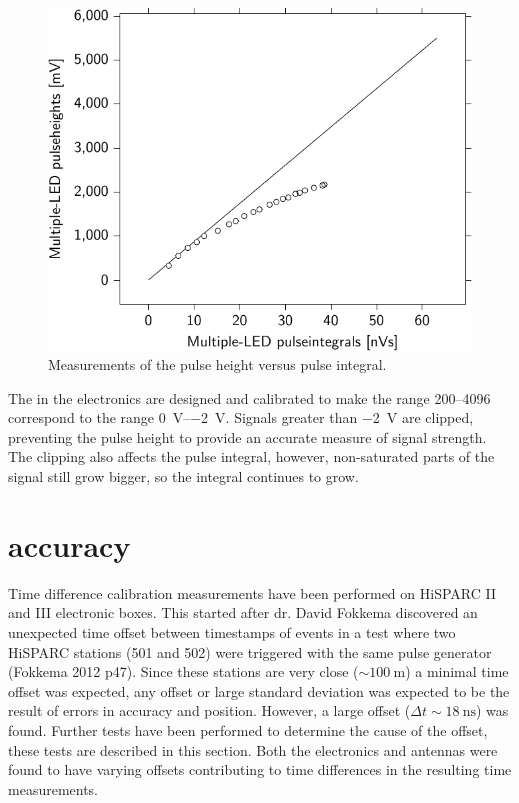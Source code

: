 \begin{figure}
    \centering
    \includegraphics{plots/calibration/linearity_senstech_ph_pi}
    \caption{Measurements of the pulse height versus pulse integral.}
    \label{fig:linearity_senstech_ph_pi}
\end{figure}

The \adcs in the \hisparc electronics are designed and calibrated to
make the range \SIrange{200}{4096}{\adc} correspond to the range
\SIrange{0}{-2}{\volt}. Signals greater than \SI{-2}{\volt} are clipped,
preventing the pulse height to provide an accurate measure of signal
strength. The clipping also affects the pulse integral, however,
non-saturated parts of the signal still grow bigger, so the integral
continues to grow.



\section{\gps accuracy}
\label{sec:gps_accuracy}

Time difference calibration measurements have been performed on
HiSPARC II and III electronic boxes. This started after dr. David
Fokkema discovered an unexpected time offset between timestamps of
events in a test where two HiSPARC stations (501 and 502) were triggered
with the same pulse generator (Fokkema 2012 p47). Since these stations
are very close ($\sim\SI{100}{\meter}$) a minimal time offset was
expected, any offset or large standard deviation was expected to be the
result of errors in \gps accuracy and position. However, a large offset
($\Delta t \sim\SI{18}{\nano\second}$) was found. Further tests have
been performed to determine the cause of the offset, these tests are
described in this section. Both the \hisparc electronics and \gps
antennas were found to have varying offsets contributing to time
differences in the resulting time measurements.


